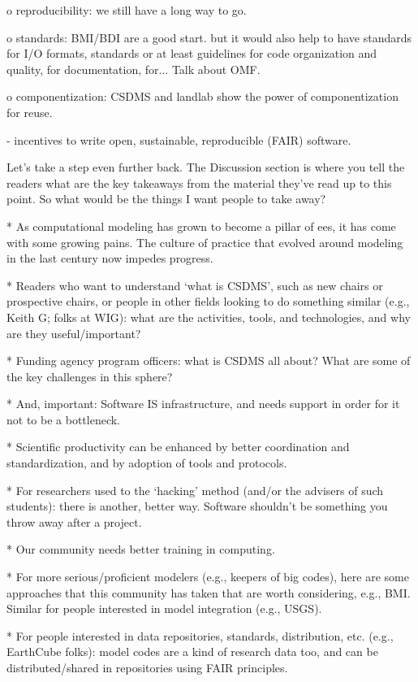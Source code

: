 \documentclass[12pt]{amsart}
\begin{document}
o reproducibility: we still have a long way to go.

o standards: BMI/BDI are a good start. but it would also help to have standards for I/O formats, standards or at least guidelines for code organization and quality, for documentation, for... Talk about OMF.

o componentization: CSDMS and landlab show the power of componentization for reuse. 

- incentives to write open, sustainable, reproducible (FAIR) software.

Let's take a step even further back. The Discussion section is where you tell the readers what are the key takeaways from the material they've read up to this point. So what would be the things I want people to take away?

* As computational modeling has grown to become a pillar of ees, it has come with some growing pains. The culture of practice that evolved around modeling in the last century now impedes progress.

* Readers who want to understand `what is CSDMS', such as new chairs or prospective chairs, or people in other fields looking to do something similar (e.g., Keith G; folks at WIG): what are the activities, tools, and technologies, and why are they useful/important?

* Funding agency program officers: what is CSDMS all about? What are some of the key challenges in this sphere? 

* And, important: Software IS infrastructure, and needs support in order for it not to be a bottleneck.

* Scientific productivity can be enhanced by better coordination and standardization, and by adoption of tools and protocols.

* For researchers used to the `hacking' method (and/or the advisers of such students): there is another, better way. Software shouldn't be something you throw away after a project.

* Our community needs better training in computing.

* For more serious/proficient modelers (e.g., keepers of big codes), here are some approaches that this community has taken that are worth considering, e.g., BMI. Similar for people interested in model integration (e.g., USGS).

* For people interested in data repositories, standards, distribution, etc. (e.g., EarthCube folks): model codes are a kind of research data too, and can be distributed/shared in repositories using FAIR principles.
\end{document}
